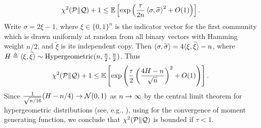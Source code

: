 \[
\chi^2(\mathcal{P}\|\mathcal{Q}) + 1 \leq \mathbb{E}\left[ \exp\left( \frac{\tau }{2n}\left \langle \sigma, \widetilde \sigma \right\rangle^2  + O(1) \right) \right].
\]
Write $\sigma=2\xi-1$, where $\xi \in \{0, 1\}^n$ is the indicator vector for the first community which is drawn uniformly at random from all binary vectors with Hamming weight $n/2$, and $\tilde \xi$ is its independent copy. Then $\langle \sigma, \widetilde \sigma \rangle = 4 \langle \xi, \widetilde \xi \rangle-n$, where 
$H \triangleq \langle \xi, \widetilde \xi \rangle \sim \text{Hypergeometric}(n,\frac{n}{2},\frac{n}{2})$. 
Thus
\[
\chi^2(\mathcal{P}\|\mathcal{Q}) + 1\leq \mathbb{E}\left[ \exp\left(  \frac{\tau}{2} \left(  \frac{4 H - n}{\sqrt{n}}  \right)^2  + O(1) \right) \right].
\]
Since $\frac{1}{\sqrt{n/16}}(H-n/4) \to {\mathcal{N}}(0,1)$ as $n\to\infty$ by the central limit theorem for hypergeometric distributions (see, e.g., \cite[p.~194]{FellerI}), using \cite[Theorem 1]{mgf.conv} for the convergence of moment generating function, we conclude that $\chi^2(\mathcal{P}\|\mathcal{Q}) $ is bounded if $\tau<1$. 

%
%
%

